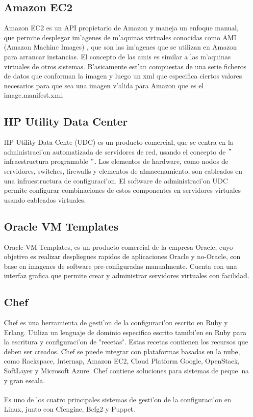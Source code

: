 \subsection{Amazon EC2}
Amazon EC2 es un API propietario de Amazon y maneja un enfoque manual, que permite desplegar im'agenes de m'aquinas virtuales conocidas como AMI (Amazon Machine Images) \cite{9}, que son las im'agenes que se utilizan en Amazon para arrancar instancias. El concepto de las amis es similar a las m'aquinas virtuales de otros sistemas. B'asicamente est'an compuestas de una serie ficheros de datos que conforman la imagen y luego un xml que especifica ciertos valores necesarios para que sea una imagen v'alida para Amazon que es el image.manifest.xml. 

\subsection{HP Utility Data Center}
HP Utility Data Cente (UDC) es un producto comercial, que se centra en la administraci'on automatizada de servidores de red, usando el concepto de $"$infraestructura programable $"$. Los elementos de hardware, como nodos de servidores, switches, firewalls y elementos de almacenamiento, son cableados en una infraestructura de configuraci'on. El software de administraci'on UDC permite configurar combinaciones de estos componentes en servidores virtuales usando cableados virtuales. \cite{15}

\subsection{Oracle VM Templates}
Oracle VM Templates, es un producto comercial de la empresa Oracle, cuyo objetivo es realizar despliegues rapidos de aplicaciones Oracle y no-Oracle, con base en imagenes de software pre-configuradas manualmente. Cuenta con una interfaz grafica que permite crear y administrar servidores virtuales con facilidad. \cite{14}

\subsection{Chef}
Chef es una herramienta de gesti'on de la configuraci'on escrito en Ruby y Erlang. Utiliza un lenguaje de dominio especifico escrito tamibi'en en Ruby para la escritura y configuraci'on de "recetas". Estas recetas contienen los recursos que deben ser creados. Chef se puede integrar con plataformas basadas en la nube, como Rackspace, Internap, Amazon EC2, Cloud Platform Google, OpenStack, SoftLayer y Microsoft Azure. Chef contiene soluciones para sistemas de peque~na y gran escala. \cite{Chef15}\\
\\
Es uno de los cuatro principales sistemas de gesti'on de la configuraci'on en Linux, junto con Cfengine, Bcfg2 y Puppet.

